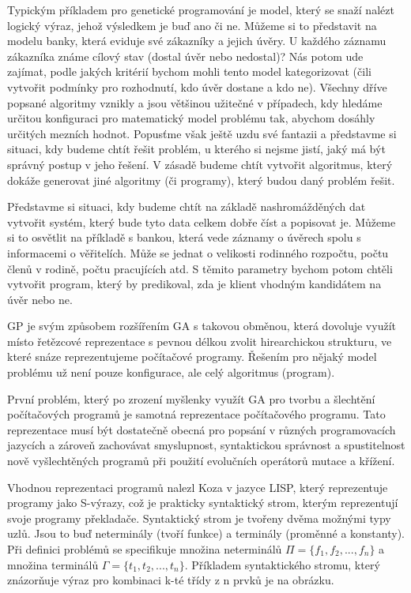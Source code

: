 \documentclass[bc,male,java,dept460]{diploma}		%
\begin{document}
Typickým příkladem pro genetické programování je model, který se snaží nalézt logický výraz, jehož výsledkem je buď ano či ne. Můžeme si to představit na modelu banky, která eviduje své zákazníky a jejich úvěry. U každého záznamu zákazníka známe cílový stav (dostal úvěr nebo nedostal)? Nás potom ude zajímat, podle jakých kritérií bychom mohli tento model kategorizovat (čili vytvořit podmínky pro rozhodnutí, kdo úvěr dostane a kdo ne).
Všechny dříve popsané algoritmy vznikly a jsou většinou užitečné v případech, kdy hledáme určitou konfiguraci pro matematický model problému tak, abychom dosáhly určitých mezních hodnot. Popusťme však ještě uzdu své fantazii a představme si situaci, kdy budeme chtít řešit problém, u kterého si nejsme jistí, jaký má být správný postup v jeho řešení. V zásadě budeme chtít vytvořit algoritmus, který dokáže generovat jiné algoritmy (či programy), který budou daný problém řešit.

Představme si situaci, kdy budeme chtít na základě nashromážděných dat vytvořit systém, který bude tyto data celkem dobře číst a popisovat je. Můžeme si to osvětlit na příkladě s bankou, která vede záznamy o úvěrech spolu s informacemi o věřitelích. Může se jednat o velikosti rodinného rozpočtu, počtu členů v rodině, počtu pracujících atd. S těmito parametry bychom potom chtěli vytvořit program, který by predikoval, zda je klient vhodným kandidátem na úvěr nebo ne.

GP je svým způsobem rozšířením GA s takovou obměnou, která dovoluje využít místo řetězcové reprezentace s pevnou délkou zvolit hirearchickou strukturu, ve které snáze reprezentujeme počítačové programy. Řešením pro nějaký model problému už není pouze konfigurace, ale celý algoritmus (program).

První problém, který po zrození myšlenky využít GA pro tvorbu a šlechtění počítačových programů je samotná reprezentace počítačového programu. Tato reprezentace musí být dostatečně obecná pro popsání v různých programovacích jazycích a zároveň zachovávat smyslupnost, syntaktickou správnost a spustitelnost nově vyšlechtěných programů při použití evolučních operátorů mutace a křížení.

Vhodnou reprezentaci programů nalezl Koza v jazyce LISP, který reprezentuje programy jako S-výrazy, což je prakticky syntaktický strom, kterým reprezentují svoje programy překladače. Syntaktický strom je tvořeny dvěma možnými typy uzlů. Jsou to buď neterminály (tvoří funkce) a terminály (proměnné a konstanty). Při definici problémů se specifikuje množina neterminálů $\Pi=\{f_1,f_2,...,f_n\}$ a množina terminálů $\Gamma=\{t_1,t_2,...,t_n\}$. Příkladem syntaktického stromu, který znázorňuje výraz pro kombinaci k-té třídy z n prvků je na obrázku.
\end{document}
